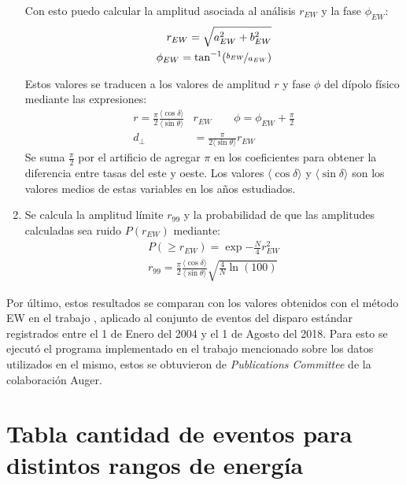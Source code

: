 \begin{enumerate}
    Con esto puedo calcular la amplitud asociada al análisis $r_{EW}$ y la fase $\phi_{EW}$:
    \begin{align*}
        r_{EW} = \sqrt{a_{EW}^2 + b_{EW}^2}\\
        \phi_{EW} = \tan^{-1}(\nicefrac{b_{EW}}{a_{EW}})
    \end{align*}

    Estos valores se traducen a los valores de amplitud $r$ y fase $\phi$ del dípolo físico mediante las expresiones:
    \begin{align*}
        r = \frac{\pi}{2} \frac{\langle\cos\delta \rangle}{\langle\sin\theta \rangle} &r_{EW} \qquad
        \phi = \phi_{EW} + \frac{\pi}{2}\\
        d_\perp&= \frac{\pi}{2 \langle\sin\theta \rangle} r_{EW}
    \end{align*}
    Se suma $\frac{\pi}{2}$ por el  artificio de agregar $\pi$ en los coeficientes para obtener la diferencia entre tasas del este y oeste. Los valores $\langle\cos\delta \rangle$ y $\langle\sin\delta \rangle$ son los valores medios de estas variables en los años estudiados. 

    \item Se calcula la amplitud límite $r_{99}$ y la probabilidad de que las amplitudes calculadas sea ruido  $P(r_{EW})$ mediante:
    \begin{align*}
        P(\geq r_{EW}) = \exp{-\frac{N}{4}r^2_{EW}}\\
        r_{99} = \frac{\pi}{2} \frac{\langle\cos\delta \rangle}{\langle\sin\theta \rangle}\sqrt{\frac{4}{N}\ln(100)}
    \end{align*}

\end{enumerate}

Por último, estos resultados se comparan con los valores obtenidos con el método EW en el trabajo \cite{Aab_2020}, aplicado al conjunto de eventos del disparo estándar registrados entre el 1 de Enero del 2004 y el 1 de Agosto del 2018. Para esto se ejecutó el programa implementado en el trabajo mencionado sobre los datos utilizados en el mismo, estos se obtuvieron de \emph{Publications Committee} de la colaboración Auger.

\section*{Tabla cantidad de eventos para distintos rangos de energía}

